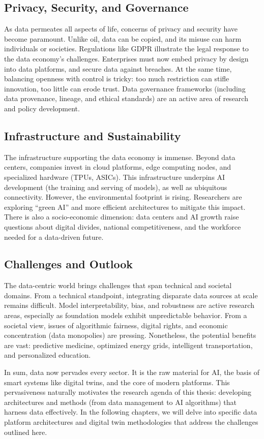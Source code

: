 \subsection{Privacy, Security, and Governance}
As data permeates all aspects of life, concerns of privacy and security have become paramount. Unlike oil, data can be copied, and its misuse can harm individuals or societies. Regulations like GDPR illustrate the legal response to the data economy’s challenges. Enterprises must now embed privacy by design into data platforms, and secure data against breaches. At the same time, balancing openness with control is tricky: too much restriction can stifle innovation, too little can erode trust. Data governance frameworks (including data provenance, lineage, and ethical standards) are an active area of research and policy development.

\subsection{Infrastructure and Sustainability}
The infrastructure supporting the data economy is immense. Beyond data centers, companies invest in cloud platforms, edge computing nodes, and specialized hardware (TPUs, ASICs). This infrastructure underpins AI development (the training and serving of models), as well as ubiquitous connectivity. However, the environmental footprint is rising. Researchers are exploring “green AI” and more efficient architectures to mitigate this impact. There is also a socio-economic dimension: data centers and AI growth raise questions about digital divides, national competitiveness, and the workforce needed for a data-driven future.

\subsection{Challenges and Outlook}
The data-centric world brings challenges that span technical and societal domains. From a technical standpoint, integrating disparate data sources at scale remains difficult. Model interpretability, bias, and robustness are active research areas, especially as foundation models exhibit unpredictable behavior. From a societal view, issues of algorithmic fairness, digital rights, and economic concentration (data monopolies) are pressing. Nonetheless, the potential benefits are vast: predictive medicine, optimized energy grids, intelligent transportation, and personalized education. 

In sum, data now pervades every sector. It is the raw material for AI, the basis of smart systems like digital twins, and the core of modern platforms. This pervasiveness naturally motivates the research agenda of this thesis: developing architectures and methods (from data management to AI algorithms) that harness data effectively. In the following chapters, we will delve into specific data platform architectures and digital twin methodologies that address the challenges outlined here.
